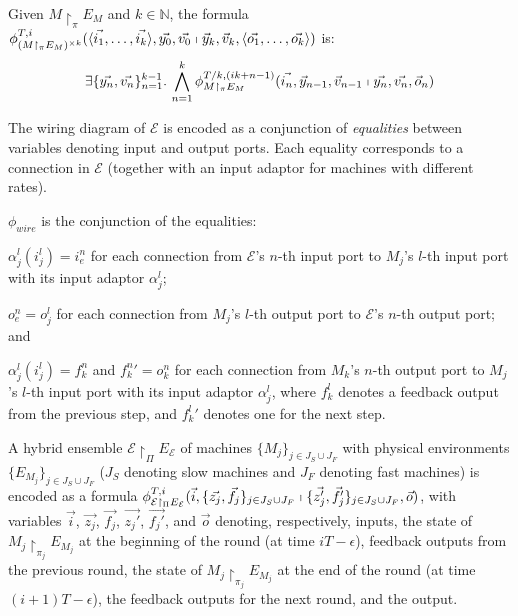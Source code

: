 \begin{definition}
Given $M \restriction_\pi E_M$ and $k \in \mathbb{N}$,
the formula
$\phi_{(M \restriction_\pi E_M)^{\times k}}^{T,
  i}(\langle\vec{i_1},\ldots,\vec{i_k}\rangle, \vec{y_0}, \vec{v_0}
\shortmid \vec{y}_{k}, \vec{v}_{k},
\langle\vec{o_1},\ldots,\vec{o_k}\rangle)$ is: 
\[
\exists\{\vec{y_n}, \vec{v_n}\}_{n=1}^{k-1}.\,
\bigwedge_{n=1}^k \phi_{M \restriction_\pi E_M}^{T/k,(ik+n-1)}(\vec{i_n}, \vec{y}_{n-1}, \vec{v}_{n-1} \shortmid \vec{y_{n}}, \vec{v_{n}}, \vec{o}_n)
\]
\end{definition}

The wiring diagram of $\mathcal{E}$ is encoded as
a conjunction of %
\emph{equalities} between variables denoting input and output ports.
Each equality corresponds to a connection in $\mathcal{E}$
(together with an input adaptor for machines with different rates).


\begin{definition}
$\phi_\mathit{wire}$ is the conjunction of the equalities:
\begin{inparaenum}[(i)]
	\item $\alpha_j^l(i_j^l) = i_e^n$
	for each connection from $\mathcal{E}$'s $n$-th input port to $M_j$'s $l$-th input port 
	with its input adaptor $\alpha_j^l$;
	\item $o_e^n = o_j^l$
	for each connection from $M_j$'s $l$-th output port to $\mathcal{E}$'s $n$-th output port; and
	\item $\alpha_j^l(i_j^l) = f_k^n$ and ${f_k^n}' = o_k^n$
	for each connection from $M_k$'s $n$-th output port to $M_j$'s $l$-th input port with its input adaptor $\alpha_j^l$,
	where $f_k^l$ denotes a feedback output from the previous step, 
	and ${f_k^l}'$ denotes one for the next step.
\end{inparaenum}
\end{definition}


A hybrid ensemble $\mathcal{E} \restriction_{\Pi} E_\mathcal{E}$ 
of machines  $\{M_j\}_{j\in J_S\cup J_F}$ with physical environments $\{E_{M_j}\}_{j\in J_S\cup J_F}$
($J_S$ denoting slow machines and $J_F$ denoting fast machines) is
encoded as a formula 
$\phi_{\mathcal{E} \restriction_{\Pi} E_\mathcal{E}}^{T,i}(
	\vec{i}, \{\vec{z_j},\vec{f_j}\}_{j\in J_S\cup J_F}
	\shortmid 
	\{\vec{z'_j}, \vec{f_j'}\}_{j\in J_S\cup J_F}, \vec{o})$,
%
with variables $\vec{i}$, $\vec{z_j}$, $\vec{f_j}$, $\vec{z_j'}$,
$\vec{f_j'}$, and $\vec{o}$ denoting, respectively, 
inputs, the state of $M_j \restriction_{\pi_j} E_{M_j}$ at the beginning of the round 
		(at time $iT - \epsilon$),
feedback outputs from the previous round,
	the  state of $M_j \restriction_{\pi_j} E_{M_j}$ at the end of the round 
		(at time $(i+1)T - \epsilon$), 
the feedback outputs for the next round,	and 
the output.


